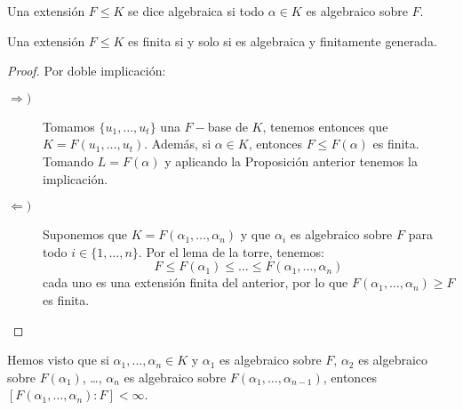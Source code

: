 \begin{definicion}
    Una extensión $F\leq K$ se dice algebraica si todo $\alpha\in K$ es algebraico sobre $F$.
\end{definicion}

\begin{teo}
    Una extensión $F\leq K$ es finita si y solo si es algebraica y finitamente generada.
    \begin{proof}
        Por doble implicación:
        \begin{description}
            \item [$\Longrightarrow )$] Tomamos $\{u_1, \ldots, u_t\}$ una $F-$base de $K$, tenemos entonces que $K = F(u_1, \ldots, u_t)$. Además, si $\alpha\in K$, entonces $F\leq F(\alpha)$ es finita. Tomando $L = F(\alpha)$ y aplicando la Proposición anterior tenemos la implicación.
            \item [$\Longleftarrow )$] Suponemos que $K = F(\alpha_1, \ldots, \alpha_n)$ y que $\alpha_i$ es algebraico sobre $F$ para todo $i\in \{1,\ldots,n\}$. Por el lema de la torre, tenemos:
                \begin{equation*}
                    F\leq F(\alpha_1) \leq \ldots \leq F(\alpha_1, ..., \alpha_n) 
                \end{equation*}
                cada uno es una extensión finita del anterior, por lo que $F(\alpha_1, \ldots, \alpha_n)\geq F$ es finita.
        \end{description}
    \end{proof}
\end{teo}

\begin{observacion}
    Hemos visto que si $\alpha_1, \ldots, \alpha_n\in K$ y $\alpha_1$ es algebraico sobre $F$, $\alpha_2 $ es algebraico sobre $F(\alpha_1)$, \ldots, $\alpha_n$ es algebraico sobre $F(\alpha_1, \ldots, \alpha_{n-1})$, entonces $[F(\alpha_1, \ldots, \alpha_n) : F] < \infty$.
\end{observacion}

